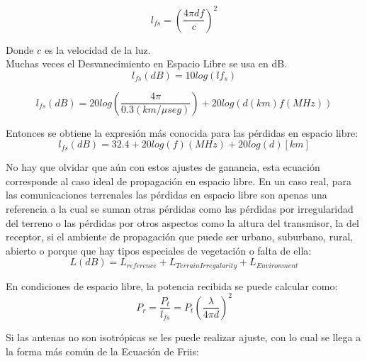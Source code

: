 \begin{equation} \label{equ_cincuenta_tres}
	 l_{fs}=  \left(\dfrac{4 \pi df}{c} \right)  ^{2}
\end{equation}

Donde $c$ es la velocidad de la luz. \\
Muchas veces el Desvanecimiento en Espacio Libre se usa en dB. \\


\begin{equation} \label{equ_cincuenta_cuatro}
	 l_{fs}(dB)=  10log(lf_{s})
\end{equation}

\begin{equation} \label{equ_cincuenta_cinco}
	 l_{fs}(dB)=  20log\left(\dfrac{4\pi}{0.3(km/\mu seg)}\right)+ 20log(d(km)f(MHz))
\end{equation}

Entonces se obtiene la expresión más conocida para las pérdidas en espacio libre: \\
\begin{equation} \label{equ_cincuenta_seis}
	 l_{fs}(dB)=  32.4+20log(f)(MHz)+20log(d)[km]
\end{equation}

No hay que olvidar que aún con estos ajustes de ganancia, esta ecuación corresponde al caso ideal de propagación en espacio libre.  En un caso real, para las comunicaciones terrenales las pérdidas en espacio libre son apenas una referencia a la cual se suman otras pérdidas como las pérdidas por irregularidad del terreno o las pérdidas por otros aspectos como la altura del transmisor, la del receptor, si el ambiente de propagación que puede ser urbano, suburbano, rural, abierto o porque que hay tipos especiales de vegetación o falta de ella: \\

\begin{equation} \label{equ_cincuenta_siete}
	L(dB)=L_{reference}+L_{Terrain Irregularity}+L_{Environment}
\end{equation}

En condiciones de espacio libre, la potencia recibida se puede calcular como: \\

\begin{equation} \label{equ_cincuenta_ocho}
	 P_r=\frac{P_t}{l_{fs}}=P_t\left(\frac{\lambda}{4\pi d}\right)^{2}
\end{equation}

Si las antenas no son isotrópicas se les puede realizar ajuste, con lo cual se llega a la forma más común de la Ecuación de Friis:

